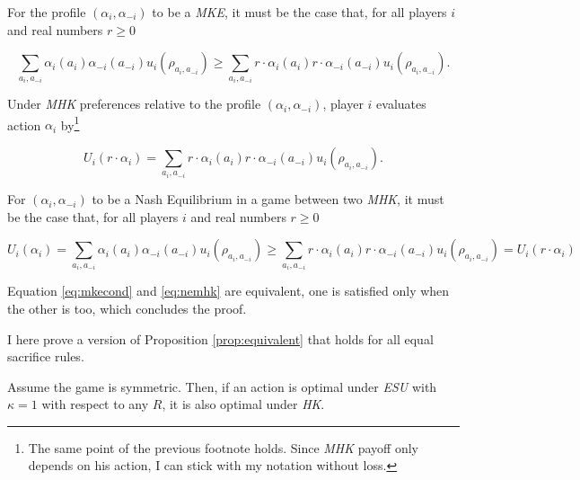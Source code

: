 \begin{mkeproof}
	For the profile \((\alpha_i,\alpha_{-i})\) to be a \textit{MKE}, it must be the case that, for all players \( i \) and real numbers \( r \geq 0 \)

	\begin{equation}\label{eq:mkecond}
		\sum_{a_i, a_{-i}} \alpha_{i} (a_i) \alpha_{-i} (a_{-i}) u_i(\rho_{a_i, a_{-i}}) \geq \sum_{a_i, a_{-i}} r \cdot \alpha_{i} (a_i) r \cdot \alpha_{-i} (a_{-i}) u_i(\rho_{a_i, a_{-i}}).
	\end{equation}

	Under \textit{MHK} preferences relative to the profile \((\alpha_i,\alpha_{-i})\), player \(i\) evaluates action \(\alpha_i\) by\footnote{The same point of the previous footnote holds. Since \textit{MHK} payoff only depends on his action, I can stick with my notation without loss.}

	\[
		U_i \left( r \cdot \alpha_{i} \right) = \sum_{a_i, a_{-i}} r \cdot \alpha_{i} (a_i) r \cdot \alpha_{-i} (a_{-i}) u_i(\rho_{a_i, a_{-i}}).
	\]

	For \((\alpha_i,\alpha_{-i})\) to be a Nash Equilibrium in a game between two \textit{MHK}, it must be the case that, for all players \( i \) and real numbers \( r \geq 0 \)

	\begin{equation}\label{eq:nemhk}
		U_i(\alpha_i) = \sum_{a_i, a_{-i}} \alpha_i (a_i) \alpha_{-i} (a_{-i}) u_i(\rho_{a_i, a_{-i}}) \geq \sum_{a_i, a_{-i}} r \cdot \alpha_{i} (a_i) r \cdot \alpha_{-i} (a_{-i}) u_i(\rho_{a_i, a_{-i}}) = U_i (r \cdot \alpha_i)
	\end{equation}

	Equation \eqref{eq:mkecond} and \eqref{eq:nemhk} are equivalent, one is satisfied only when the other is too, which concludes the proof.
\end{mkeproof}

I here prove a version of Proposition \ref{prop:equivalent} that holds for all equal sacrifice rules.

\begin{prop}\label{prop:equivalentapp}
	Assume the game is symmetric. Then, if an action is optimal under \textit{ESU} with \( \kappa = 1 \) with respect to any \( R \), it is also optimal under \textit{HK}.
\end{prop}

